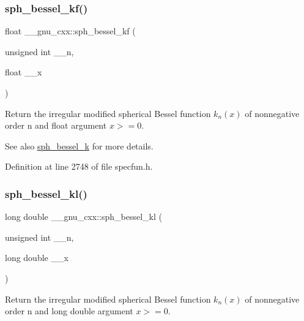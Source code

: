 \subsubsection{\texorpdfstring{sph\+\_\+bessel\+\_\+kf()}{sph\_bessel\_kf()}}
{\footnotesize\ttfamily float \+\_\+\+\_\+gnu\+\_\+cxx\+::sph\+\_\+bessel\+\_\+kf (\begin{DoxyParamCaption}\item[{unsigned int}]{\+\_\+\+\_\+n,  }\item[{float}]{\+\_\+\+\_\+x }\end{DoxyParamCaption})\hspace{0.3cm}{\ttfamily [inline]}}

Return the irregular modified spherical Bessel function $ k_n(x) $ of nonnegative order n and {\ttfamily float} argument $ x >= 0 $.

\begin{DoxySeeAlso}{See also}
\hyperlink{group__gnu__math__spec__func_ga288b28f2c6995d052a4f5f17293cbf1a}{sph\+\_\+bessel\+\_\+k} for more details. 
\end{DoxySeeAlso}


Definition at line 2748 of file specfun.\+h.

\mbox{\label{group__gnu__math__spec__func_ga22f6a73e50e7020a7c2fa64ce1b9be41}} 
\subsubsection{\texorpdfstring{sph\+\_\+bessel\+\_\+kl()}{sph\_bessel\_kl()}}
{\footnotesize\ttfamily long double \+\_\+\+\_\+gnu\+\_\+cxx\+::sph\+\_\+bessel\+\_\+kl (\begin{DoxyParamCaption}\item[{unsigned int}]{\+\_\+\+\_\+n,  }\item[{long double}]{\+\_\+\+\_\+x }\end{DoxyParamCaption})\hspace{0.3cm}{\ttfamily [inline]}}

Return the irregular modified spherical Bessel function $ k_n(x) $ of nonnegative order n and {\ttfamily long double} argument $ x >= 0 $.

